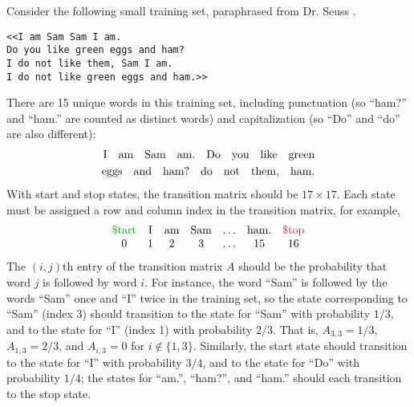 
Consider the following small training set, paraphrased from Dr. Seuss \cite{geisel1960green}.

\begin{lstlisting}
<<I am Sam Sam I am.
Do you like green eggs and ham?
I do not like them, Sam I am.
I do not like green eggs and ham.>>
\end{lstlisting}

There are 15 unique words in this training set, including punctuation (so ``ham?'' and ``ham.'' are counted as distinct words) and capitalization (so ``Do'' and ``do'' are also different):
%
\begin{align*}
\text{I\quad am\quad Sam\quad am.\quad Do\quad you\quad like\quad green}
\\
\text{eggs\quad and\quad ham?\quad do\quad not\quad them,\quad ham.}
\end{align*}
%
With start and stop states, the transition matrix should be $17 \times 17$.
Each state must be assigned a row and column index in the transition matrix, for example,
%
\begin{align*}
\begin{array}{ccccccc}
\text{\textcolor[rgb]{0,.6,0}{\$tart}} & \text{I} & \text{am} & \text{Sam} & \ldots & \text{ham.} & \text{\textcolor{red}{\$top}}
\\
0 & 1 & 2 & 3 & \ldots & 15 & 16
\end{array}
\end{align*}
%
The $(i,j)$th entry of the transition matrix $A$ should be the probability that word $j$ is followed by word $i$.
For instance, the word ``Sam'' is followed by the words ``Sam'' once and ``I'' twice in the training set, so the state corresponding to ``Sam'' (index 3) should transition to the state for ``Sam'' with probability $1/3$, and to the state for ``I'' (index 1) with probability $2/3$.
That is, $A_{3,3} = 1/3$, $A_{1,3} = 2/3$, and $A_{i,3} = 0$ for $i \notin\{1,3\}$.
Similarly, the start state should transition to the state for ``I'' with probability $3/4$, and to the state for ``Do'' with probability $1/4$; the states for ``am.'', ``ham?'', and ``ham.'' should each transition to the stop state.

